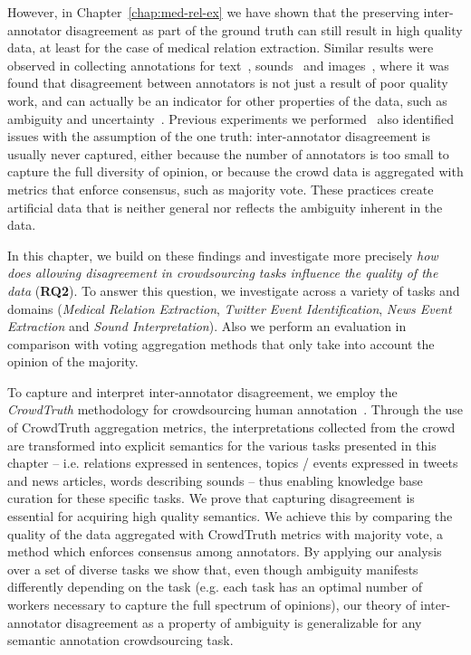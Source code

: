 However, in Chapter~\ref{chap:med-rel-ex} we have shown that the preserving inter-annotator disagreement as part of the ground truth can still result in high quality data, at least for the case of medical relation extraction. Similar results were observed in collecting annotations for text~\cite{poesio2005reliability,chang2016linguistic}, sounds~\cite{doi:10.1080/09298215.2016.1200631} and images~\cite{schaekermann2016,cheplygina2018crowd}, where it was found that disagreement between annotators is not just a result of poor quality work, and can actually be an indicator for other properties of the data, such as ambiguity and uncertainty~\cite{aroyo2018aimag}. Previous experiments we performed~\cite{aroyo2013crowd} also identified issues with the assumption of the one truth: inter-annotator disagreement is usually never captured, either because the number of annotators is too small to capture the full diversity of opinion, or because the crowd data is aggregated with metrics that enforce consensus, such as majority vote.  These practices create artificial data that is neither general nor reflects the ambiguity inherent in the data.

In this chapter, we build on these findings and investigate more precisely \textit{how does allowing disagreement in crowdsourcing tasks influence the quality of the data} (\textbf{RQ2}). To answer this question, we investigate across a variety of tasks and domains (\textit{Medical Relation Extraction}, \textit{Twitter Event Identification}, \textit{News Event Extraction} and \textit{Sound Interpretation}). Also we perform an evaluation in comparison with voting aggregation methods that only take into account the opinion of the majority.

To capture and interpret inter-annotator disagreement, we employ the \textit{CrowdTruth} methodology for crowdsourcing human annotation~\cite{aroyo2014threesides}. Through the use of CrowdTruth aggregation metrics, the interpretations collected from the crowd are transformed into explicit semantics for the various tasks presented in this chapter -- i.e. relations expressed in sentences, topics / events expressed in tweets and news articles, words describing sounds -- thus enabling knowledge base curation for these specific tasks.  We prove that capturing disagreement is essential for acquiring high quality semantics.  We achieve this by comparing the quality of the data aggregated with CrowdTruth metrics with majority vote, a method which enforces consensus among annotators.  By applying our analysis over a set of diverse tasks we show that, even though ambiguity manifests differently depending on the task (e.g. each task has an optimal number of workers necessary to capture the full spectrum of opinions), our theory of inter-annotator disagreement as a property of ambiguity is generalizable for any semantic annotation crowdsourcing task.

